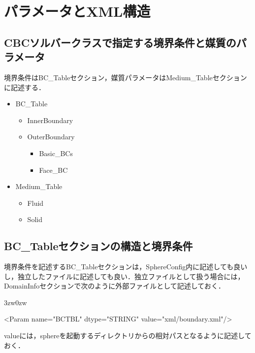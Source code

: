 \graphicspath{{./fig_BC/}}

%
\section{パラメータとXML構造}

%
\subsection{CBCソルバークラスで指定する境界条件と媒質のパラメータ}

境界条件はBC\_Tableセクション，媒質パラメータはMedium\_Tableセクションに記述する．

\begin{itemize}
\item BC\_Table
	\begin{itemize}
	\item InnerBoundary
	\item OuterBoundary
	\begin{itemize}
		\item Basic\_BCs
		\item Face\_BC
	\end{itemize}
	\end{itemize}
\item Medium\_Table
	\begin{itemize}
	\item Fluid
	\item Solid
	\end{itemize}
\end{itemize}

%
\subsection{BC\_Tableセクションの構造と境界条件}
境界条件を記述するBC\_Tableセクションは，SphereConfig内に記述しても良いし，独立したファイルに記述しても良い．独立ファイルとして扱う場合には，DomainInfoセクションで次のように外部ファイルとして記述しておく．

\begin{indentation}{3zw}{0zw}
\small
\begin{program}
<Param name="BCTBL" dtype="STRING" value="xml/boundary.xml"/>
\end{program}
\noindent valueには，sphereを起動するディレクトリからの相対パスとなるように記述しておく．
\end{indentation}
\vspace{2mm}

